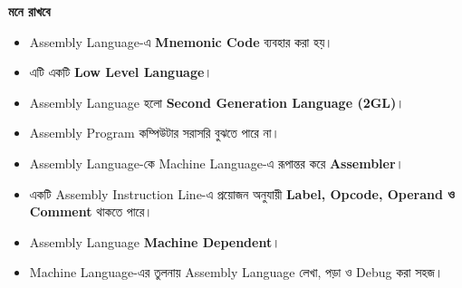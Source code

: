 \begin{rememberbox}
\textbf{\color{deepOrange}মনে রাখবে}
\begin{itemize}
\item Assembly Language-এ \textbf{Mnemonic Code} ব্যবহার করা হয়।
\item এটি একটি \textbf{Low Level Language}।
\item Assembly Language হলো \textbf{Second Generation Language (2GL)}।
\item Assembly Program কম্পিউটার সরাসরি বুঝতে পারে না।
\item Assembly Language-কে Machine Language-এ রূপান্তর করে \textbf{Assembler}।
\item একটি Assembly Instruction Line-এ প্রয়োজন অনুযায়ী \textbf{Label, Opcode, Operand ও Comment} থাকতে পারে।
\item Assembly Language \textbf{Machine Dependent}।
\item Machine Language-এর তুলনায় Assembly Language লেখা, পড়া ও Debug করা সহজ।
\end{itemize}
\end{rememberbox}

\small

